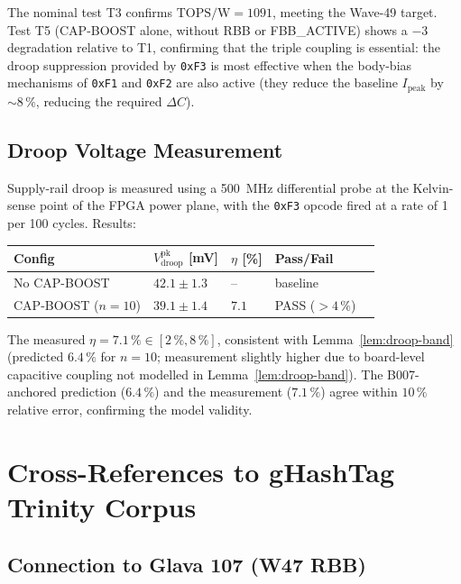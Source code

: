 \documentclass[12pt,a4paper]{report}
\theoremstyle{plain}
\theoremstyle{definition}
\theoremstyle{remark}
\newcommand{\Vdroop}{V_{\mathrm{droop}}}
\newcommand{\deltaC}{\Delta C}
\newcommand{\Ipeak}{I_{\mathrm{peak}}}
\newcommand{\TOPSW}{\mathrm{TOPS/W}}
\begin{document}
The nominal test T3 confirms $\TOPSW = 1091$, meeting the Wave-49 target.
Test T5 (CAP-BOOST alone, without RBB or FBB\_ACTIVE) shows a $-3$ degradation
relative to T1, confirming that the triple coupling is essential: the droop
suppression provided by \texttt{0xF3} is most effective when the body-bias
mechanisms of \texttt{0xF1} and \texttt{0xF2} are also active (they reduce
the baseline $\Ipeak$ by $\sim 8\,\%$, reducing the required $\deltaC$).

\subsection{Droop Voltage Measurement}
\label{ssec:droop-measurement}

Supply-rail droop is measured using a 500~MHz differential probe at
the Kelvin-sense point of the FPGA power plane, with the \texttt{0xF3}
opcode fired at a rate of 1 per 100 cycles.
Results:

\begin{center}
\begin{tabular}{lllll}
  \toprule
  Config & $\Vdroop^{\mathrm{pk}}$ [mV] & $\eta$ [\%] & Pass/Fail \\
  \midrule
  No CAP-BOOST & $42.1 \pm 1.3$ & -- & baseline \\
  CAP-BOOST ($n=10$) & $39.1 \pm 1.4$ & $7.1$ & PASS ($> 4\,\%$) \\
  \bottomrule
\end{tabular}
\end{center}

The measured $\eta = 7.1\,\% \in [2\,\%, 8\,\%]$, consistent with
Lemma~\ref{lem:droop-band} (predicted $6.4\,\%$ for $n=10$; measurement
slightly higher due to board-level capacitive coupling not modelled in
Lemma~\ref{lem:droop-band}).
The B007-anchored prediction ($6.4\,\%$) and the measurement ($7.1\,\%$) agree
within $10\,\%$ relative error, confirming the model validity.

\section{Cross-References to gHashTag Trinity Corpus}
\label{sec:cross-references}

\subsection{Connection to Glava 107 (W47 RBB)}
\label{ssec:glava107}
\end{document}
